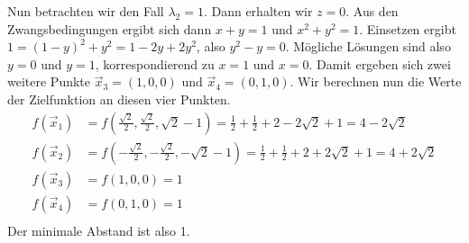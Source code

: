 \documentclass{article}
\theoremstyle{definition}
\begin{document}
Nun betrachten wir den Fall $\lambda_2 = 1$. Dann erhalten wir $z = 0$. Aus den Zwangsbedingungen ergibt sich dann $x+y = 1$ und $x^2+y^2 = 1$. Einsetzen ergibt $1 = (1-y)^2 + y^2 = 1 - 2y + 2y^2$, also $y^2-y = 0$. Mögliche Lösungen sind also $y = 0$ und $y = 1$, korrespondierend zu $x = 1$ und $x = 0$. Damit ergeben sich zwei weitere Punkte $\vec{x}_3 = (1,0,0)$ und $\vec{x}_4 = (0,1,0)$.
Wir berechnen nun die Werte der Zielfunktion an diesen vier Punkten.
\begin{align*}
	f(\vec{x}_1) &= f(\frac{\sqrt{2}}{2},\frac{\sqrt{2}}{2}, \sqrt{2}-1) = \frac{1}{2} + \frac{1}{2} + 2 - 2\sqrt{2} + 1 = 4 - 2\sqrt{2}\\
	f(\vec{x}_2) &= f(-\frac{\sqrt{2}}{2},-\frac{\sqrt{2}}{2},-\sqrt{2}-1) = \frac{1}{2} + \frac{1}{2} + 2 + 2\sqrt{2} + 1 = 4 + 2\sqrt{2}\\
	f(\vec{x}_3) &= f(1,0,0) = 1\\
	f(\vec{x}_4) &= f(0,1,0) = 1\\
\end{align*}
Der minimale Abstand ist also 1.
\end{document}
